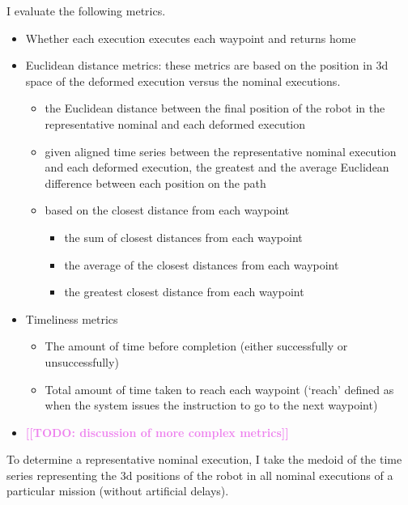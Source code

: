 \documentclass[conference]{IEEEtran}
\newcommand{\todo}[1]{\textcolor{violet}{{\bfseries [[TODO: #1]]}}}
\begin{document}
I evaluate the following metrics.
\begin{itemize}

\item Whether each execution executes each waypoint and returns home
\item Euclidean distance metrics: these metrics are based on the position in 3d space of the deformed execution versus the nominal executions.
\begin{itemize}

\item the Euclidean distance between the final position of the robot in the representative nominal and each deformed execution
\item given aligned time series between the representative nominal execution and each deformed execution, the greatest and the average Euclidean difference between each position on the path
\item based on the closest distance from each waypoint
\begin{itemize}

\item the sum of closest distances from each waypoint
\item the average of the closest distances from each waypoint
\item the greatest closest distance from each waypoint
\end{itemize}


\end{itemize}
\item Timeliness metrics
\begin{itemize}

\item The amount of time before completion (either successfully or unsuccessfully)
\item Total amount of time taken to reach each waypoint (`reach' defined as when the system issues the instruction to go to the next waypoint)
\end{itemize}

\item \todo{discussion of more complex metrics}
\end{itemize}


To determine a representative nominal execution, I take the medoid of the time series representing the 3d positions of the robot in all nominal executions of a particular mission (without artificial delays).
\end{document}
